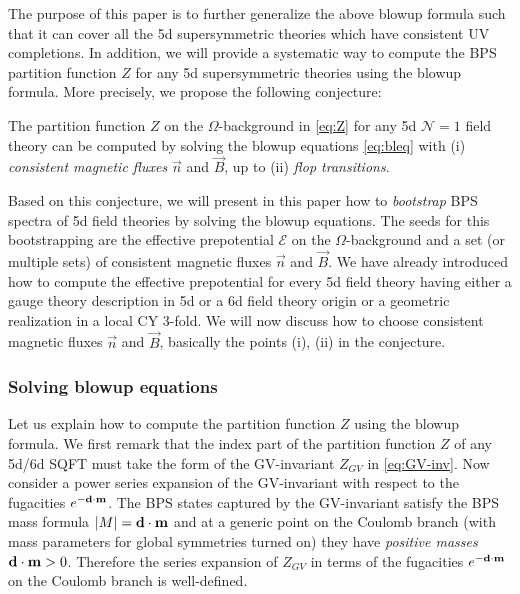 The purpose of this paper is to further generalize the above blowup formula such that it can cover all the 5d supersymmetric theories which have consistent UV completions. In addition, we will provide a systematic way to compute the BPS partition function $Z$ for any 5d supersymmetric theories using the blowup formula. More precisely, we propose the following conjecture:
\begin{framed}
 The partition function $Z$ on the $\Omega$-background in \eqref{eq:Z} for any 5d $\mathcal{N}=1$ field theory can be computed by solving the blowup equations \eqref{eq:bleq} with (i) {\it  consistent magnetic fluxes} $\vec{n}$ and $\vec{B}$, up to (ii) {\it flop transitions}.
\end{framed}

Based on this conjecture, we will present in this paper how to {\it bootstrap} BPS spectra of 5d field theories by solving the blowup equations. The seeds for this bootstrapping are the effective prepotential $\mathcal{E}$ on the $\Omega$-background and a set (or multiple sets) of consistent magnetic fluxes $\vec{n}$ and $\vec{B}$. We have already introduced how to compute the effective prepotential for every 5d field theory having either a gauge theory description in 5d or a 6d field theory origin or a geometric realization in a local CY 3-fold. We will now discuss how to choose consistent magnetic fluxes $\vec{n}$ and $\vec{B}$, basically the points (i), (ii) in the conjecture.


\subsubsection{Solving blowup equations}

Let us explain how to compute the partition function $Z$ using the blowup formula. We first remark that the index part of the partition function $Z$ of any 5d/6d SQFT must take the form of the GV-invariant  $Z_{GV}$ in \eqref{eq:GV-inv}. Now consider a power series expansion of the GV-invariant with respect to the fugacities $e^{-{\bf d}\cdot {\bf m}}$. The BPS states captured by the GV-invariant satisfy the BPS mass formula $|M|={\bf d}\cdot {\bf m}$ and at a generic point on the Coulomb branch (with mass parameters for global symmetries turned on) they have {\it positive masses} ${\bf d}\cdot {\bf m}>0$. Therefore the series expansion of $Z_{GV}$ in terms of the fugacities $e^{-{\bf d}\cdot {\bf m}}$ on the Coulomb branch is well-defined.


